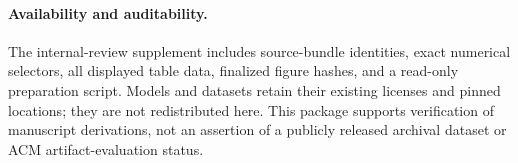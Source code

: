 \paragraph{Availability and auditability.}
The internal-review supplement includes source-bundle identities, exact numerical selectors, all displayed table data, finalized figure hashes, and a read-only preparation script. Models and datasets retain their existing licenses and pinned locations; they are not redistributed here. This package supports verification of manuscript derivations, not an assertion of a publicly released archival dataset or ACM artifact-evaluation status.
